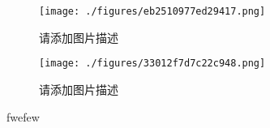 
\begin{figure}[ht]
\centering
\texttt{[image: ./figures/eb2510977ed29417.png]}
\caption{请添加图片描述} \label{fig_testA_1}
\end{figure}

\begin{figure}[ht]
\centering
\texttt{[image: ./figures/33012f7d7c22c948.png]}
\caption{请添加图片描述} \label{fig_testA_2}
\end{figure}

fwefew
